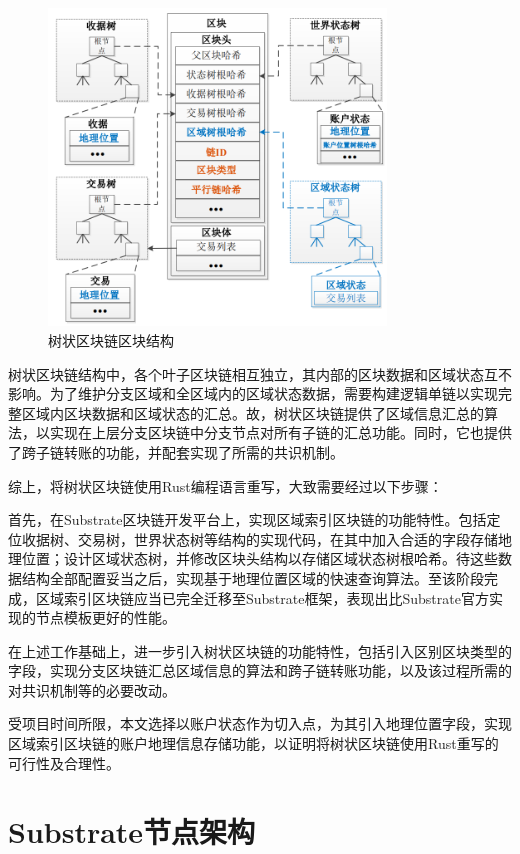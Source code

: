 \begin{figure}[htbp]
    \centering
    \includegraphics[width=0.8\textwidth]{images/树状区块链区块结构.png}
    \caption{树状区块链区块结构}\label{树状链区块结构示意图} %
\end{figure}

树状区块链结构中，各个叶子区块链相互独立，其内部的区块数据和区域状态互不影响。为了维护分支区域和全区域内的区域状态数据，需要构建逻辑单链以实现完整区域内区块数据和区域状态的汇总。故，树状区块链提供了区域信息汇总的算法，以实现在上层分支区块链中分支节点对所有子链的汇总功能。同时，它也提供了跨子链转账的功能，并配套实现了所需的共识机制。

综上，将树状区块链使用Rust编程语言重写，大致需要经过以下步骤：

首先，在Substrate区块链开发平台上，实现区域索引区块链的功能特性。包括定位收据树、交易树，世界状态树等结构的实现代码，在其中加入合适的字段存储地理位置；设计区域状态树，并修改区块头结构以存储区域状态树根哈希。待这些数据结构全部配置妥当之后，实现基于地理位置区域的快速查询算法。至该阶段完成，区域索引区块链应当已完全迁移至Substrate框架，表现出比Substrate官方实现的节点模板更好的性能。

在上述工作基础上，进一步引入树状区块链的功能特性，包括引入区别区块类型的字段，实现分支区块链汇总区域信息的算法和跨子链转账功能，以及该过程所需的对共识机制等的必要改动。

受项目时间所限，本文选择以账户状态作为切入点，为其引入地理位置字段，实现区域索引区块链的账户地理信息存储功能，以证明将树状区块链使用Rust重写的可行性及合理性。

\section{Substrate节点架构}

